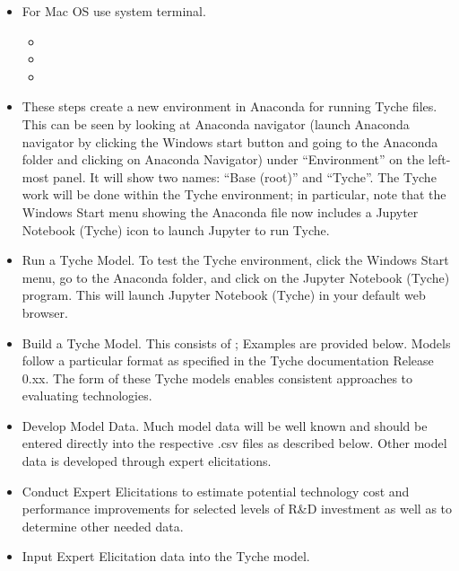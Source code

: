 \documentclass[letterpaper,10pt,english]{sphinxmanual}
\begin{document}
\begin{itemize}
\begin{description}
\begin{itemize}
\item {} 

\end{itemize}

\end{description}

\item {} 
For Mac OS use system terminal.
\begin{itemize}
\item {} 

\item {} 

\item {} 

\end{itemize}

\end{itemize}
\begin{itemize}
\item {} 
These steps create a new environment in Anaconda for running Tyche files.  This can be seen by looking at Anaconda navigator (launch Anaconda navigator by clicking the Windows start button and going to the Anaconda folder and clicking on Anaconda Navigator) under “Environment” on the left-most panel.  It will show two names: “Base (root)” and “Tyche”.  The Tyche work will be done within the Tyche environment; in particular, note that the Windows Start menu showing the Anaconda file now includes a Jupyter Notebook (Tyche) icon to launch Jupyter to run Tyche.

\item {} 
Run a Tyche Model.  To test the Tyche environment, click the Windows Start menu, go to the Anaconda folder, and click on the Jupyter Notebook (Tyche) program.  This will launch Jupyter Notebook (Tyche) in your default web browser.

\item {} 
Build a Tyche Model.  This consists of ; Examples are provided below.  Models follow a particular format as specified in the Tyche documentation Release 0.xx.  The form of these Tyche models enables consistent approaches to evaluating technologies.

\item {} 
Develop Model Data.  Much model data will be well known and should be entered directly into the respective .csv files as described below.  Other model data is developed through expert elicitations.

\item {} 
Conduct Expert Elicitations to estimate potential technology cost and performance improvements for selected levels of R\&D investment as well as to determine other needed data.

\item {} 
Input Expert Elicitation data into the Tyche model.

\end{itemize}
\end{document}
